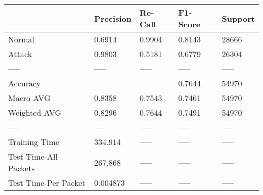 \begin{tabular}{lllll}
\toprule
{} & Precision & Re-Call & F1-Score & Support \\
\midrule
Normal                &    0.6914 &  0.9904 &   0.8143 &   28666 \\
Attack                &    0.9803 &  0.5181 &   0.6779 &   26304 \\
-----                 &     ----- &   ----- &    ----- &   ----- \\
Accuracy              &           &         &   0.7644 &   54970 \\
Macro AVG             &    0.8358 &  0.7543 &   0.7461 &   54970 \\
Weighted AVG          &    0.8296 &  0.7644 &   0.7491 &   54970 \\
-----                 &     ----- &   ----- &    ----- &   ----- \\
Training Time         &   334.914 &   ----- &    ----- &   ----- \\
Test Time-All Packets &   267.868 &   ----- &    ----- &   ----- \\
Test Time-Per Packet  &  0.004873 &   ----- &    ----- &   ----- \\
\bottomrule
\end{tabular}
